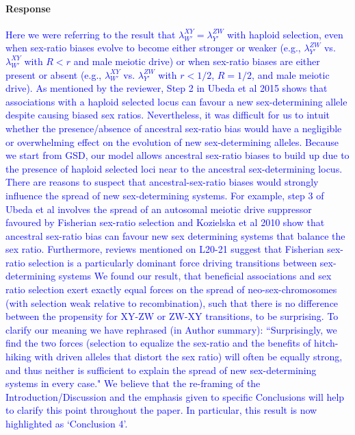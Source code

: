 \documentclass[10pt,letterpaper]{article}
\begin{document}
\noindent\paragraph{Response}
\textcolor{blue}{
Here we were referring to the result that $\lambda_{W'}^{XY} = \lambda_{Y'}^{ZW}$ with haploid selection, even when sex-ratio biases evolve to become either stronger or weaker (e.g., $\lambda_{Y'}^{ZW}$ vs. $\lambda_{W'}^{XY}$ with $R<r$ and male meiotic drive) or when sex-ratio biases are either present or absent (e.g., $\lambda_{W'}^{XY}$ vs. $\lambda_{Y'}^{ZW}$ with $r<1/2$, $R=1/2$, and male meiotic drive).  
As mentioned by the reviewer, Step 2 in Ubeda et al 2015 shows that associations with a haploid selected locus can favour a new sex-determining allele despite causing biased sex ratios. 
Nevertheless, it was difficult for us to intuit whether the presence/absence of ancestral sex-ratio bias would have a negligible or overwhelming effect on the evolution of new sex-determining alleles. 
Because we start from GSD, our model allows ancestral sex-ratio biases to build up due to the presence of haploid selected loci near to the ancestral sex-determining locus. 
There are reasons to suspect that ancestral-sex-ratio biases would strongly influence the spread of new sex-determining systems.
For example, step 3 of Ubeda et al involves the spread of an autosomal meiotic drive suppressor favoured by Fisherian sex-ratio selection and Kozielska et al 2010 show that ancestral sex-ratio bias can favour new sex determining systems that balance the sex ratio.
Furthermore, reviews mentioned on L20-21 suggest that Fisherian sex-ratio selection is a particularly dominant force driving transitions between sex-determining systems
We found our result, that beneficial associations and sex ratio selection exert exactly equal forces on the spread of neo-sex-chromosomes (with selection weak relative to recombination), such that there is no difference between the propensity for XY-ZW or ZW-XY transitions, to be surprising.
To clarify our meaning we have rephrased (in Author summary): ``Surprisingly, we find the two forces (selection to equalize the sex-ratio and the benefits of hitch-hiking with driven alleles that distort the sex ratio) will often be equally strong, and thus neither is sufficient to explain the spread of new sex-determining systems in every case." 
We believe that the re-framing of the Introduction/Discussion and the emphasis given to specific Conclusions will help to clarify this point throughout the paper. 
In particular, this result is now highlighted as `Conclusion 4'.
}
\end{document}
